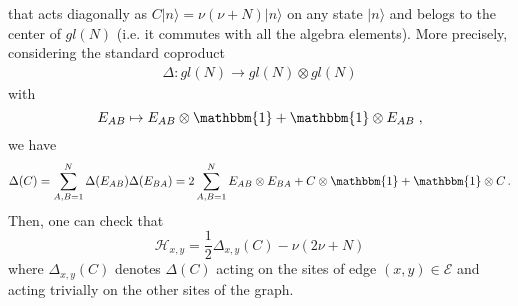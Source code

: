 \documentclass[10pt]{article}
\numberwithin{equation}{section}
\numberwithin{equation}{subsection}
\newcommand{\co}{\;,}
\newcommand{\twoj}{\nu}
\begin{document}
that acts diagonally as $C|{n}\rangle=\twoj(\twoj+N)|{n}\rangle$ on any state $|n\rangle$ and belogs to the center of ${gl}(N)$ (i.e. it commutes with all the algebra elements).  
More precisely,  considering the standard coproduct 
\begin{equation}
\begin{split}
\Delta:{gl}(N)\to {gl}(N)\otimes {gl}(N)
\end{split}
\end{equation}
with
\begin{equation}
E_{AB}\mapsto E_{AB}\otimes \mathbbm{1}+\mathbbm{1}\otimes E_{AB}\co
\end{equation} 
we have 
\begin{equation}
\Delta(C)=\sum_{A,B=1}^{N}\Delta(E_{AB})\Delta(E_{BA})=2\sum_{A,B=1}^{N}E_{AB}\otimes E_{BA}+C\otimes \mathbbm{1}+\mathbbm{1}\otimes C\,.
\end{equation}
Then, one can check that 
\begin{equation}\label{hamiltonianCasimir}
	\mathcal{H}_{x,y}=\frac{1}{2}\Delta_{x,y}(C)-\twoj(2\twoj+N)
\end{equation}
where $\Delta_{x,y}(C)$ denotes  $\Delta(C)$ acting on  the sites of edge $(x,y)\in \mathcal{E}$ and acting trivially on the other sites of the graph.



 
\end{document}
